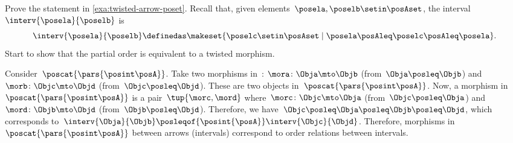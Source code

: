 \begin{exercise}
    Prove the statement in \cref{exa:twisted-arrow-poset}.
    Recall that, given elements~$\posela, \poselb \setin \posAset$, the interval~$\interv{\posela}{\poselb}$ is
    \begin{equation}
        \interv{\posela}{\poselb}
        \definedas \makeset{\poselc \setin \posAset \mid \posela\posAleq \poselc \posAleq \posela}.
    \end{equation}
    Start to show that the partial order is equivalent to a twisted morphism.
\end{exercise}
\begin{solution}
    Consider~$\poscat{\pars{\posint\posA}}$.
    Take two morphisms in~\posA: $\mora\colon \Obja \mto \Objb$ (from~$\Obja \posleq \Objb$) and $\morb\colon \Objc\mto \Objd$ (from~$\Objc \posleq \Objd$).
    These are two objects in~$\poscat{\pars{\posint\posA}}$.
    Now, a morphism in~$\poscat{\pars{\posint\posA}}$ is a pair~$\tup{\morc,\mord}$ where~$\morc\colon \Objc \mto \Obja$ (from~$\Objc\posleq \Obja$) and~$\mord\colon \Objb \mto \Objd$ (from~$\Objb\posleq \Objd$).
    Therefore, we have~$\Objc\posleq \Obja\posleq \Objb\posleq \Objd$, which corresponds to~$\interv{\Obja}{\Objb}\posleqof{\posint{\posA}}\interv{\Objc}{\Objd}$.
    Therefore, morphisms in~$\poscat{\pars{\posint\posA}}$ between arrows (intervals) correspond to order relations between intervals.
\end{solution}


\vfill

